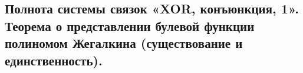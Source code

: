 \subsection{Полнота системы связок «XOR, конъюнкция, 1». Теорема о представлении булевой функции полиномом Жегалкина (существование и единственность).}
